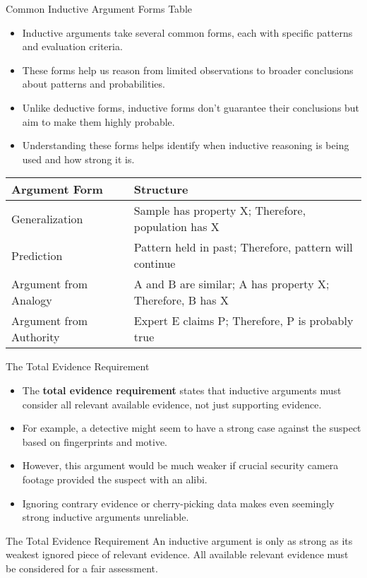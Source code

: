 \documentclass{beamer}
\begin{document}
\begin{frame}{Common Inductive Argument Forms Table}
	\begin{itemize}
		\item Inductive arguments take several common forms, each with specific patterns and evaluation criteria.
		\item These forms help us reason from limited observations to broader conclusions about patterns and probabilities.
		\item Unlike deductive forms, inductive forms don't guarantee their conclusions but aim to make them highly probable.
		\item Understanding these forms helps identify when inductive reasoning is being used and how strong it is.
	\end{itemize}
	
	\begin{table}[h]
		\scriptsize
		\centering
		\begin{tabular}{|l|l|}
			\hline
			\textbf{Argument Form} & \textbf{Structure} \\
			\hline
			Generalization & Sample has property X; Therefore, population has X \\
			\hline
			Prediction & Pattern held in past; Therefore, pattern will continue \\
			\hline
			Argument from Analogy & A and B are similar; A has property X; Therefore, B has X \\
			\hline
			Argument from Authority & Expert E claims P; Therefore, P is probably true \\
			\hline
		\end{tabular}
	\end{table}
\end{frame}

\begin{frame}{The Total Evidence Requirement}
	\begin{itemize}
		\item The \textbf{total evidence requirement} states that inductive arguments must consider all relevant available evidence, not just supporting evidence.
		\item For example, a detective might seem to have a strong case against the suspect based on fingerprints and motive.
		\item However, this argument would be much weaker if crucial security camera footage provided the suspect with an alibi.
		\item Ignoring contrary evidence or cherry-picking data makes even seemingly strong inductive arguments unreliable.
	\end{itemize}
	
	\begin{alertblock}{The Total Evidence Requirement}
		An inductive argument is only as strong as its weakest ignored piece of relevant evidence. All available relevant evidence must be considered for a fair assessment.
	\end{alertblock}
\end{frame}
\end{document}
